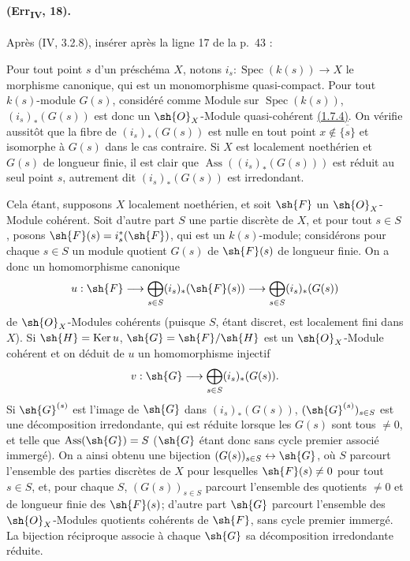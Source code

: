 \paragraph{(Err\textsubscript{IV}, 18).}
Après (IV, 3.2.8), insérer après la ligne 17 de la p.~43 :

\begin{remark}[3.2.9]
\label{IV.3.2.9}
Pour tout point $s$ d'un préschéma $X$, notons
$i_s:\operatorname{Spec}(k(s))\to X$ le morphisme canonique, qui est
un monomorphisme quasi-compact. Pour tout $k(s)$-module $G(s)$,
considéré comme Module sur $\operatorname{Spec}(k(s))$,
$(i_s)_*(G(s))$ est donc un $\sh{O}_X$-Module quasi-cohérent
{\hyperlink{ega4.c04.statement.1-7-4}{(1.7.4)}}. On vérifie aussitôt
que la fibre de $(i_s)_*(G(s))$ est nulle en tout point
$x\notin\overline{\{s\}}$ et isomorphe à $G(s)$ dans le cas contraire.
Si $X$ est localement noethérien et $G(s)$ de longueur finie, il est
clair que $\operatorname{Ass}((i_s)_*(G(s)))$ est réduit au seul point
$s$, autrement dit $(i_s)_*(G(s))$ est irredondant.

Cela étant, supposons $X$ localement noethérien, et soit $\sh{F}$ un
$\sh{O}_X$-Module cohérent. Soit d'autre part $S$ une partie discrète
de $X$, et pour tout $s\in S$, posons
$\sh{F}(s)=i_s^*(\sh{F})$, qui est un $k(s)$-module; considérons pour
chaque $s\in S$ un module quotient $G(s)$ de $\sh{F}(s)$ de longueur
finie. On a donc un homomorphisme canonique
\[
 u:\sh{F}\longrightarrow
 \bigoplus_{s\in S}(i_s)_*(\sh{F}(s))\longrightarrow
 \bigoplus_{s\in S}(i_s)_*(G(s))
\]
de $\sh{O}_X$-Modules cohérents (puisque $S$, étant discret, est
localement fini dans $X$). Si $\sh{H}=\operatorname{Ker}u$,
$\sh{G}=\sh{F}/\sh{H}$ est un $\sh{O}_X$-Module cohérent et on déduit
de $u$ un homomorphisme injectif
\[
 v:\sh{G}\longrightarrow\bigoplus_{s\in S}(i_s)_*(G(s)).
\]
Si $\sh{G}^{(s)}$ est l'image de $\sh{G}$ dans $(i_s)_*(G(s))$,
$(\sh{G}^{(s)})_{s\in S}$ est une décomposition irredondante, qui est
réduite lorsque les $G(s)$ sont tous $\neq0$, et telle que
$\operatorname{Ass}(\sh{G})=S$ ($\sh{G}$ étant donc sans cycle premier
associé immergé). On a ainsi obtenu une bijection
$(G(s))_{s\in S}\leftrightarrow\sh{G}$, où $S$ parcourt l'ensemble des
parties discrètes de $X$ pour lesquelles $\sh{F}(s)\neq0$ pour tout
$s\in S$, et, pour chaque $S$, $(G(s))_{s\in S}$ parcourt l'ensemble
des quotients $\neq0$ et de longueur finie des $\sh{F}(s)$; d'autre
part $\sh{G}$ parcourt l'ensemble des $\sh{O}_X$-Modules quotients
cohérents de $\sh{F}$, sans cycle premier immergé. La bijection
réciproque associe à chaque $\sh{G}$ sa décomposition irredondante
réduite.
\end{remark}

